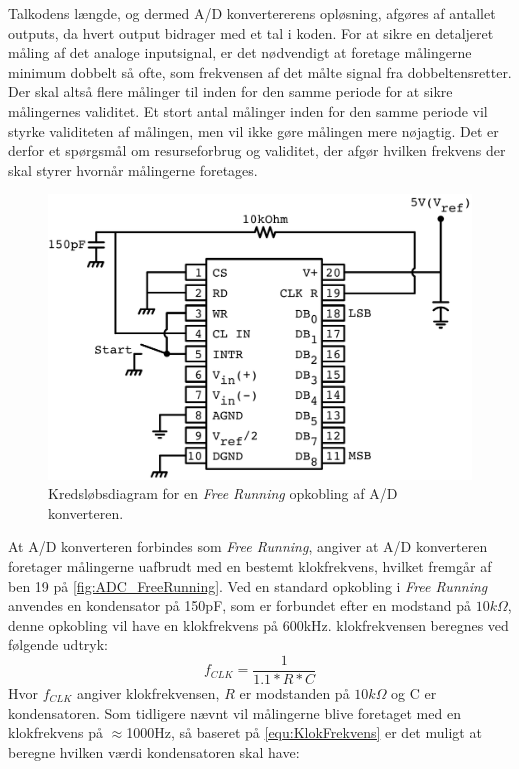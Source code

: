 Talkodens længde, og dermed A/D konvertererens opløsning, afgøres af antallet outputs, da hvert output bidrager med et tal i koden. For at sikre en detaljeret måling af det analoge inputsignal, er det nødvendigt at foretage målingerne minimum dobbelt så ofte, som frekvensen af det målte signal fra dobbeltensretter. Der skal altså flere målinger til inden for den samme periode for at sikre målingernes validitet. Et stort antal målinger inden for den samme periode vil styrke validiteten af målingen, men vil ikke gøre målingen mere nøjagtig. Det er derfor et spørgsmål om resurseforbrug og validitet, der afgør hvilken frekvens der skal styrer hvornår målingerne foretages.
%
\begin{figure}[H]
	\centering
	\includegraphics[resolution=300,scale=\circuitSize]{Figure/Circuits/ADC_FreeRunning}
	\caption{Kredsløbsdiagram for en \textit{Free Running} opkobling af A/D konverteren.\parencite[s. 11]{PDF:ADC}}
	\label{fig:ADC_FreeRunning}
\end{figure}
\noindent
%
At A/D konverteren forbindes som \textit{Free Running}, angiver at A/D konverteren foretager målingerne uafbrudt med en bestemt klokfrekvens, hvilket fremgår af ben 19 på \autoref{fig:ADC_FreeRunning}. Ved en standard opkobling i \textit{Free Running} anvendes en kondensator på 150pF, som er forbundet efter en modstand på $10k\Omega$, denne opkobling vil have en klokfrekvens på 600kHz. klokfrekvensen beregnes ved følgende udtryk:
%
\begin{equation}
	f_{CLK} = \frac{1}{1.1*R*C}
	\label{equ:KlokFrekvens}
\end{equation}
%
Hvor $f_{CLK}$ angiver klokfrekvensen, $R$ er modstanden på $10k\Omega$ og C er kondensatoren. Som tidligere nævnt vil målingerne blive foretaget med en klokfrekvens på $\approx$1000Hz, så baseret på \autoref{equ:KlokFrekvens} er det muligt at beregne hvilken værdi kondensatoren skal have:
